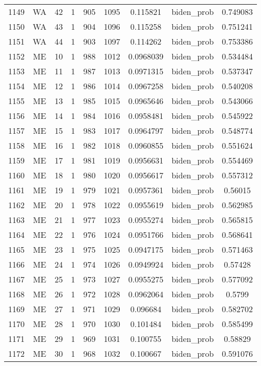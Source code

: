 \documentclass[12pt,a4paper]{article}
\begin{document}
\begin{tabular}{r|cccccccc}
	1149 & WA & 42 & 1 & 905 & 1095 & 0.115821 & biden\_prob & 0.749083 \\
	1150 & WA & 43 & 1 & 904 & 1096 & 0.115258 & biden\_prob & 0.751241 \\
	1151 & WA & 44 & 1 & 903 & 1097 & 0.114262 & biden\_prob & 0.753386 \\
	1152 & ME & 10 & 1 & 988 & 1012 & 0.0968039 & biden\_prob & 0.534484 \\
	1153 & ME & 11 & 1 & 987 & 1013 & 0.0971315 & biden\_prob & 0.537347 \\
	1154 & ME & 12 & 1 & 986 & 1014 & 0.0967258 & biden\_prob & 0.540208 \\
	1155 & ME & 13 & 1 & 985 & 1015 & 0.0965646 & biden\_prob & 0.543066 \\
	1156 & ME & 14 & 1 & 984 & 1016 & 0.0958481 & biden\_prob & 0.545922 \\
	1157 & ME & 15 & 1 & 983 & 1017 & 0.0964797 & biden\_prob & 0.548774 \\
	1158 & ME & 16 & 1 & 982 & 1018 & 0.0960855 & biden\_prob & 0.551624 \\
	1159 & ME & 17 & 1 & 981 & 1019 & 0.0956631 & biden\_prob & 0.554469 \\
	1160 & ME & 18 & 1 & 980 & 1020 & 0.0956617 & biden\_prob & 0.557312 \\
	1161 & ME & 19 & 1 & 979 & 1021 & 0.0957361 & biden\_prob & 0.56015 \\
	1162 & ME & 20 & 1 & 978 & 1022 & 0.0955619 & biden\_prob & 0.562985 \\
	1163 & ME & 21 & 1 & 977 & 1023 & 0.0955274 & biden\_prob & 0.565815 \\
	1164 & ME & 22 & 1 & 976 & 1024 & 0.0951766 & biden\_prob & 0.568641 \\
	1165 & ME & 23 & 1 & 975 & 1025 & 0.0947175 & biden\_prob & 0.571463 \\
	1166 & ME & 24 & 1 & 974 & 1026 & 0.0949924 & biden\_prob & 0.57428 \\
	1167 & ME & 25 & 1 & 973 & 1027 & 0.0955275 & biden\_prob & 0.577092 \\
	1168 & ME & 26 & 1 & 972 & 1028 & 0.0962064 & biden\_prob & 0.5799 \\
	1169 & ME & 27 & 1 & 971 & 1029 & 0.096684 & biden\_prob & 0.582702 \\
	1170 & ME & 28 & 1 & 970 & 1030 & 0.101484 & biden\_prob & 0.585499 \\
	1171 & ME & 29 & 1 & 969 & 1031 & 0.100755 & biden\_prob & 0.58829 \\
	1172 & ME & 30 & 1 & 968 & 1032 & 0.100667 & biden\_prob & 0.591076 \\

\end{tabular}
\end{document}
